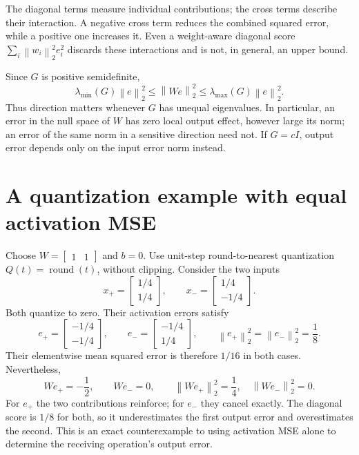 \documentclass[10pt,a4paper]{article}
\newcommand{\norm}[1]{\left\lVert #1\right\rVert}
\begin{document}
The diagonal terms measure individual contributions; the cross terms describe
their interaction. A negative cross term reduces the combined squared error,
while a positive one increases it. Even a weight-aware diagonal score
$\sum_i\norm{w_i}_2^2 e_i^2$ discards these interactions and is not, in
general, an upper bound.

Since $G$ is positive semidefinite,
\begin{equation}
  \lambda_{\min}(G)\norm{e}_2^2
  \leq\norm{We}_2^2
  \leq\lambda_{\max}(G)\norm{e}_2^2.
  \label{aed:spectral-bounds}
\end{equation}
Thus direction matters whenever $G$ has unequal eigenvalues. In particular,
an error in the null space of $W$ has zero local output effect, however large
its norm; an error of the same norm in a sensitive direction need not.
If $G=cI$, output error depends only on the input error norm instead.

\section{A quantization example with equal activation MSE}
Choose $W=\begin{bmatrix}1&1\end{bmatrix}$ and $b=0$. Use unit-step
round-to-nearest quantization $Q(t)=\operatorname{round}(t)$, without clipping.
Consider the two inputs
\begin{equation}
  x_+=\begin{bmatrix}1/4\\1/4\end{bmatrix},\qquad
  x_-=\begin{bmatrix}1/4\\-1/4\end{bmatrix}.
  \label{aed:example-inputs}
\end{equation}
Both quantize to zero. Their activation errors satisfy
\begin{equation}
  e_+=\begin{bmatrix}-1/4\\-1/4\end{bmatrix},\qquad
  e_-=\begin{bmatrix}-1/4\\1/4\end{bmatrix},\qquad
  \norm{e_+}_2^2=\norm{e_-}_2^2=\frac18.
  \label{aed:example-residuals}
\end{equation}
Their elementwise mean squared error is therefore $1/16$ in both cases.
Nevertheless,
\begin{equation}
  We_+=-\frac12,\qquad We_-=0,
  \qquad \norm{We_+}_2^2=\frac14,\quad\norm{We_-}_2^2=0.
  \label{aed:example-outputs}
\end{equation}
For $e_+$ the two contributions reinforce; for $e_-$ they cancel exactly.
The diagonal score is $1/8$ for both, so it underestimates the first output
error and overestimates the second. This is an exact counterexample to using
activation MSE alone to determine the receiving operation's output error.
\end{document}
